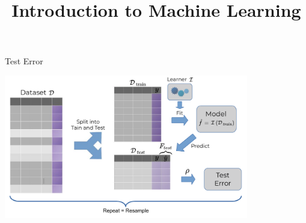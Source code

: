 




\newcommand{\titlefigure}{figure/eval_test_3}
\newcommand{\learninggoals}{
\item Understand the definition of test error
\item Understand how overfitting can be seen in the test error}
\usepackage{../../style/lmu-lecture}


\title{Introduction to Machine Learning}
\date{}




















\begin{vbframe}{Test Error}

\includegraphics[width=0.8\textwidth, trim=270 0 0 0, clip]{figure_man/test_error.pdf}

\end{vbframe}



